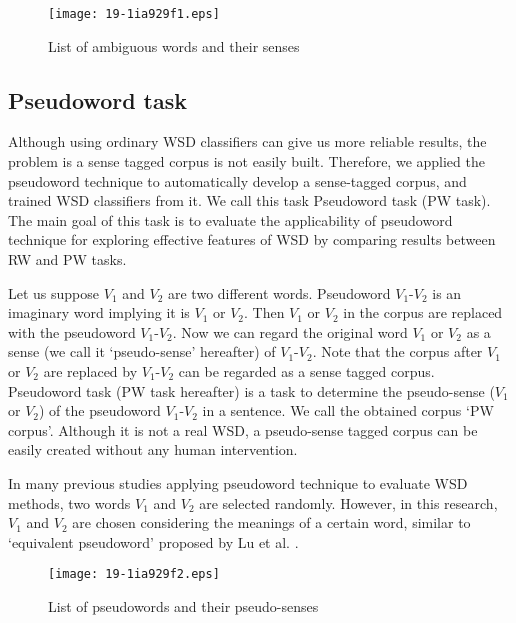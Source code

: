 \documentclass[english]{jnlp_1.4}
\begin{document}
\begin{figure}[b]
\begin{center}
\texttt{[image: 19-1ia929f1.eps]}
\end{center}
  \caption{List of ambiguous words and their senses}
  \label{listword}
\end{figure}


\subsection{Pseudoword task}
\label{pw_task}
Although using ordinary WSD classifiers can give us more reliable results,
the problem is a sense tagged corpus is not easily built.
Therefore, we applied the pseudoword technique to automatically develop a sense-tagged corpus,
and trained WSD classifiers from it.
We call this task Pseudoword task (PW task).
The main goal of this task is to evaluate the applicability of pseudoword technique for exploring effective features of WSD by comparing results between RW and PW tasks.

Let us suppose $V_{1}$ and $V_{2}$ are two different words. 
Pseudoword $V_{1}$-$V_{2}$ is an imaginary word implying it is $V_{1}$ or $V_{2}$. Then $V_{1}$ or $V_{2}$ in the corpus are replaced with the pseudoword $V_{1}$-$V_{2}$. 
Now we can regard the original word $V_{1}$ or $V_{2}$ as a sense (we call it `pseudo-sense' hereafter) of $V_{1}$-$V_{2}$. 
Note that the corpus after $V_{1}$ or $V_{2}$ are replaced by $V_{1}$-$V_{2}$ can be regarded as a sense tagged corpus.
Pseudoword task (PW task hereafter) is a task to determine the pseudo-sense ($V_{1}$ or $V_{2}$) of the pseudoword $V_{1}$-$V_{2}$ in a sentence.
We call the obtained corpus `PW corpus'. 
Although it is not a real WSD, a pseudo-sense tagged corpus can be easily created without any human intervention.

In many previous studies applying pseudoword technique to evaluate WSD methods, 
two words $V_{1}$ and $V_{2}$ are selected randomly. 
However, in this research, $V_{1}$ and $V_{2}$ are chosen considering the meanings of a certain word, 
similar to `equivalent pseudoword' proposed by Lu et al. \cite{Lu2006}.

\begin{figure}[t]
\begin{center}
\texttt{[image: 19-1ia929f2.eps]}
\end{center}
  \caption{List of pseudowords and their pseudo-senses}
  \label{listpw}
\vspace*{-0.5\Cvs}
\end{figure}
\end{document}
